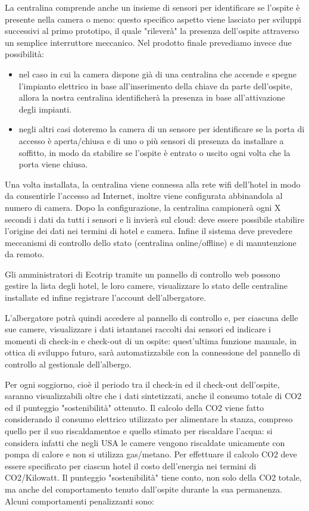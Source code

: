La centralina comprende anche un insieme di sensori per identificare se l'ospite
è presente nella camera o meno: questo specifico aspetto viene lasciato per
sviluppi successivi al primo prototipo, il quale "rileverà" la presenza
dell'ospite attraverso un semplice interruttore meccanico. Nel prodotto finale
prevediamo invece due possibilità:
\begin{itemize}
    \item nel caso in cui la camera dispone già di una centralina che accende e spegne
    l'impianto elettrico in base all'inserimento della chiave da parte
    dell'ospite, allora la nostra centralina identificherà la presenza in base
    all'attivazione degli impianti.
    \item negli altri casi doteremo la camera di un sensore per identificare se la porta
    di accesso è aperta/chiusa e di uno o più sensori di presenza da installare a
    soffitto, in modo da stabilire se l'ospite è entrato o uscito ogni volta che
    la porta viene chiusa.
\end{itemize}

Una volta installata, la centralina viene connessa alla rete wifi dell'hotel in
modo da consentirle l'accesso ad Internet, inoltre viene configurata abbinandola
al numero di camera. Dopo la configurazione, la centralina campionerà ogni X
secondi i dati da tutti i sensori e li invierà sul cloud: deve essere possibile
stabilire l'origine dei dati nei termini di hotel e camera. Infine il sistema
deve prevedere meccanismi di controllo dello stato (centralina online/offline) e
di manutenzione da remoto.

Gli amministratori di Ecotrip tramite un pannello di controllo web possono
gestire la lista degli hotel, le loro camere, visualizzare lo stato delle
centraline installate ed infine registrare l'account dell'albergatore.

L'albergatore potrà quindi accedere al pannello di controllo e, per ciascuna
delle sue camere, visualizzare i dati istantanei raccolti dai sensori ed
indicare i momenti di check-in e check-out di un ospite: quest'ultima funzione
manuale, in ottica di sviluppo futuro, sarà automatizzabile con la connessione
del pannello di controllo al gestionale dell'albergo.

Per ogni soggiorno, cioè il periodo tra il check-in ed il check-out dell'ospite,
saranno visualizzabili oltre che i dati sintetizzati, anche il consumo totale di
CO2 ed il punteggio "sostenibilità" ottenuto. Il calcolo della CO2 viene fatto
considerando il consumo elettrico utilizzato per alimentare la stanza, compreso
quello per il suo riscaldamentoe e quello stimato per riscaldare l'acqua: si
considera infatti che negli USA le camere vengono riscaldate unicamente con
pompa di calore e non si utilizza gas/metano. Per effettuare il calcolo CO2 deve
essere specificato per ciascun hotel il costo dell'energia nei termini di
CO2/Kilowatt. Il punteggio "sostenibilità" tiene conto, non solo della CO2
totale, ma anche del comportamento tenuto dall'ospite durante la sua permanenza.
Alcuni comportamenti penalizzanti sono:

